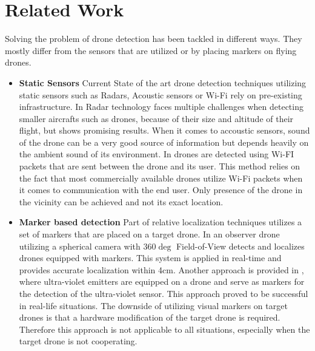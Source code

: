 \documentclass[twoside]{ctuthesis}
\theoremstyle{plain}
\theoremstyle{definition}
\theoremstyle{note}
\begin{document}
\section{Related Work}
Solving the problem of drone detection has been tackled in different ways. They mostly differ from the sensors that are utilized or by placing markers on flying drones.
\begin{itemize}
	\item \textbf{Static Sensors} Current State of the art drone detection techniques utilizing static sensors such as Radars, Acoustic sensors or Wi-Fi rely on pre-existing infrastructure. In \cite{8337899} Radar technology faces multiple challenges when detecting smaller aircrafts such as drones, because of their size and altitude of their flight, but shows promising results. When it comes to accoustic sensors, sound of the drone can be a very good source of information but depends heavily on the ambient sound of its environment\cite{8337899}. In \cite{drone-det-wifi} drones are detected using Wi-FI packets that are sent between the drone and its user. This method relies on the fact that most commercially available drones utilize Wi-Fi packets when it comes to communication with the end user. Only presence of the drone in the vicinity can be achieved and not its exact location.
	\item \textbf{Marker based detection} Part of relative localization techniques utilizes a set of markers that are placed on a target drone. In \cite{holter2020relative} an observer drone utilizing a spherical camera with $360\deg$ Field-of-View detects and localizes drones equipped with markers. This system is applied in real-time and provides accurate localization within 4cm. Another approach is provided in \cite{8651535}, where ultra-violet emitters are equipped on a drone and serve as markers for the detection of the ultra-violet sensor. This approach proved to be successful in real-life situations. The downside of utilizing visual markers on target drones is that a hardware modification of the target drone is required. Therefore this approach is not applicable to all situations, especially when the target drone is not cooperating.

\end{itemize}
\end{document}
